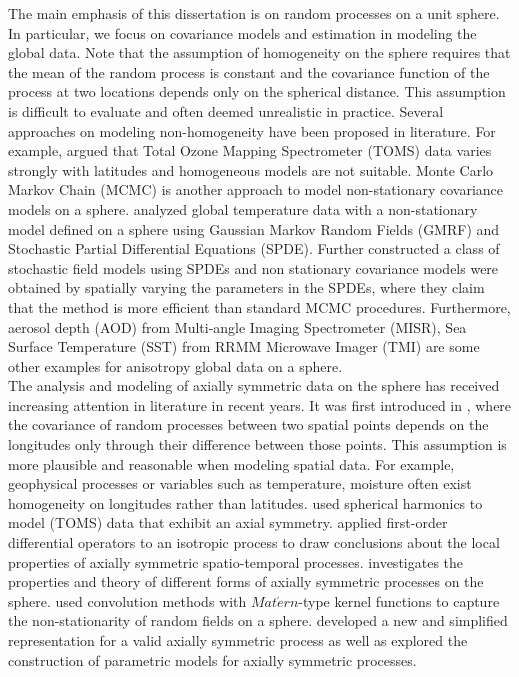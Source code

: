 
The main emphasis of this dissertation is on random processes on a unit sphere. In particular, we focus on covariance models and estimation in modeling the global data. Note that the assumption of homogeneity on the sphere requires that the mean of the random process is constant and the covariance function of the process at two locations depends only on the spherical distance. This assumption is difficult to evaluate and often deemed unrealistic in practice. Several approaches on modeling non-homogeneity have been proposed in literature. For example, \cite{Stein2007} argued that Total Ozone Mapping Spectrometer (TOMS) data varies strongly with latitudes and homogeneous models are not suitable. Monte Carlo Markov Chain (MCMC) is another approach to model non-stationary covariance models on a sphere. \cite{Lindgren2011} analyzed global temperature data with a non-stationary model defined on a sphere using Gaussian Markov Random Fields (GMRF) and Stochastic Partial Differential Equations (SPDE). Further \cite{BolinLindgren2011} constructed a class of stochastic field models using SPDEs and non stationary covariance models were obtained by spatially varying the parameters in the SPDEs, where they claim that the method is more efficient than standard MCMC procedures. Furthermore, aerosol depth (AOD) from Multi-angle Imaging Spectrometer (MISR), Sea Surface Temperature (SST) from RRMM Microwave Imager (TMI) are some other examples for anisotropy global data on a sphere. \\

The analysis and modeling of axially symmetric data on the sphere has received increasing attention in literature in recent years. It was first introduced in \cite{Jones1963}, where the covariance of random processes between two spatial points depends on the longitudes only through their difference between those points. This assumption is more plausible and reasonable when modeling spatial data. For example, geophysical processes or variables such as temperature, moisture often exist homogeneity on longitudes rather than latitudes. \cite{Stein2007} used spherical harmonics to model (TOMS) data that exhibit an axial symmetry. \cite{JunStein2008} applied first-order differential operators to an isotropic process to draw conclusions about the local properties of axially symmetric spatio-temporal processes. \cite{HitczenkoStein2012} investigates the properties and theory of different forms of axially symmetric processes on the sphere.  \cite{Li2013} used convolution methods with $Mat\acute{e}rn$-type kernel functions to capture the non-stationarity of random fields on a sphere. \cite{Huang2012} developed a new and simplified representation for a valid axially symmetric process as well as explored the construction of parametric models for axially symmetric processes. \\


